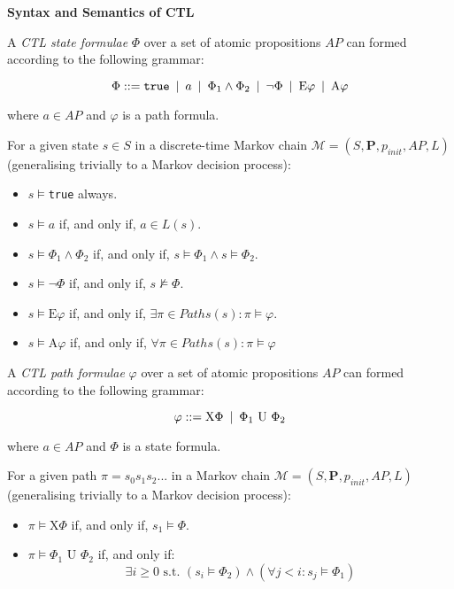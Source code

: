 {\begin{defi}
{\setlength{\parskip}{2em}
\textbf{Syntax and Semantics of CTL}\vspace{1em}\\}
{\setlength{\parskip}{1em} 
A \textit{CTL state formulae} $\Phi$ over a set of atomic propositions $AP$ can formed according to the following grammar:

\begin{equation}
	\Phi ::= \text{\texttt{true}} \:\mid\: a \:\mid\: \Phi_1 \wedge \Phi_2 \:\mid\: \neg \Phi \:\mid\: \text{E} \varphi \:\mid\: \text{A} \varphi
\end{equation}

where $a \in AP$ and $\varphi$ is a path formula.

For a given state $s \in S$ in a discrete-time Markov chain $\mathcal{M} = (S, \mathbf{P}, p_{init}, AP, L)$ (generalising trivially to a Markov decision process):
\begin{itemize}
	\item $s \models $\texttt{true} always.
	\item $s \models a$ if, and only if, $a \in L(s)$.
	\item $s \models \Phi_1 \wedge \Phi_2$ if, and only if, $s \models \Phi_1 \wedge s \models \Phi_2$.
	\item $s \models \neg \Phi$ if, and only if, $s \not\models \Phi$.
	\item $s \models \text{E} \varphi$ if, and only if, $\exists \pi \in Paths(s): \pi \models \varphi$.
	\item $s \models \text{A} \varphi$ if, and only if, $\forall \pi \in Paths(s): \pi \models \varphi$
\end{itemize}

A \textit{CTL path formulae} $\varphi$ over a set of atomic propositions $AP$ can formed according to the following grammar:

\begin{equation}
	\varphi ::= \text{X} \Phi \:\mid\: \Phi_1 \text{ U } \Phi_2
\end{equation}

where $a \in AP$ and $\Phi$ is a state formula.

For a given path $\pi = s_0s_1s_2...$ in a Markov chain $\mathcal{M} = (S, \mathbf{P}, p_{init}, AP, L)$ (generalising trivially to a Markov decision process):
\begin{itemize}
	\item $\pi \models \text{X}\Phi$ if, and only if, $s_1 \models \Phi$.
	\item $\pi \models \Phi_1\text{ U }\Phi_2$ if, and only if:
	 \begin{equation}
	 	\exists i \geq 0 \text{ s.t. } (s_i \models \Phi_2) \wedge (\forall j < i: s_j \models \Phi_1)
	\end{equation}
\end{itemize}

}
\end{defi}}
